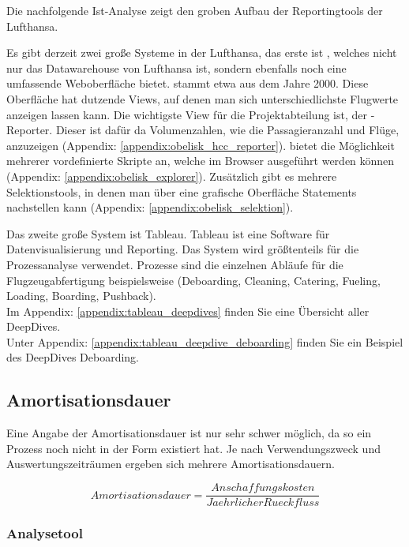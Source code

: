 		{

			\noindent
			Die nachfolgende Ist-Analyse zeigt den groben Aufbau der Reportingtools der Lufthansa.
		}
		{
			 \noindent
			Es gibt derzeit zwei große Systeme in der Lufthansa, das erste ist , welches nicht nur das Datawarehouse von Lufthansa ist, sondern ebenfalls noch eine umfassende Weboberfläche bietet.  stammt etwa aus dem Jahre 2000.
			Diese Oberfläche hat dutzende Views, auf denen man sich unterschiedlichste Flugwerte anzeigen lassen kann. Die wichtigste View für die Projektabteilung ist, der -Reporter. Dieser ist dafür da Volumenzahlen, wie die Passagieranzahl und Flüge, anzuzeigen (Appendix: \ref{appendix:obelisk_hcc_reporter}).
			 bietet die Möglichkeit mehrerer vordefinierte  Skripte an, welche im Browser ausgeführt werden können (Appendix: \ref{appendix:obelisk_explorer}).
			Zusätzlich gibt es mehrere Selektionstools, in denen man über eine grafische Oberfläche  Statements nachstellen kann (Appendix: \ref{appendix:obelisk_selektion}).
		}

		{
			\noindent
			Das zweite große System ist Tableau. Tableau ist eine Software für Datenvisualisierung und Reporting. Das System wird größtenteils für die Prozessanalyse verwendet. Prozesse sind die einzelnen Abläufe für die Flugzeugabfertigung beispielsweise (Deboarding, Cleaning, Catering, Fueling, Loading, Boarding, Pushback).\\

		}
		{
			\noindent
			Im Appendix: \ref{appendix:tableau_deepdives} finden Sie eine Übersicht aller DeepDives.\\
			Unter Appendix: \ref{appendix:tableau_deepdive_deboarding} finden Sie ein Beispiel des DeepDives Deboarding.
		}

	\subsection{Amortisationsdauer}

	{
		\noindent
		Eine Angabe der Amortisationsdauer ist nur sehr schwer möglich, da so ein Prozess noch nicht in der Form existiert hat. Je nach Verwendungszweck und Auswertungszeiträumen ergeben sich mehrere Amortisationsdauern.

		\[ Amortisationsdauer = \frac{Anschaffungskosten}{Jaehrlicher Rueckfluss} \]

	}
	
	\subsubsection{Analysetool}

